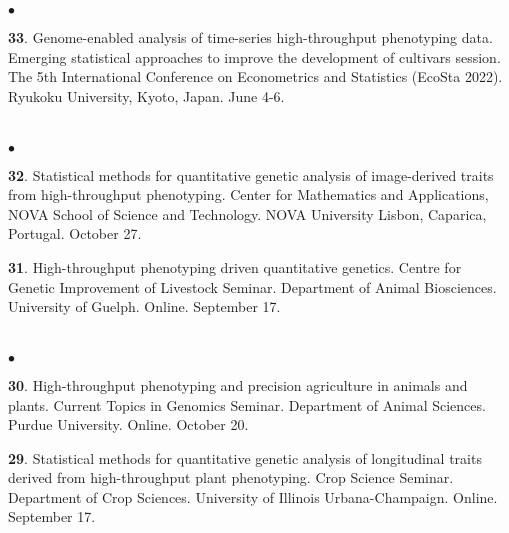 \documentclass[margin,line,10pt]{res}
\newenvironment{list2}{
  \begin{list}{$\bullet$}{%
      \setlength{\itemsep}{0in}
      \setlength{\parsep}{0in} \setlength{\parskip}{0in}
      \setlength{\topsep}{0in} \setlength{\partopsep}{0in} 
      \setlength{\leftmargin}{0.2in}}}{\end{list}}
\begin{document}
\begin{resume}
\begin{list2}
\vspace{0.5cm}


\item [{\bf 33}.] Genome-enabled analysis of time-series high-throughput phenotyping data. Emerging statistical approaches to improve the development of cultivars session. The 5th International Conference on Econometrics and Statistics (EcoSta 2022). Ryukoku University, Kyoto, Japan. June 4-6.

  
\end{list2}



\section{}
\begin{list2}

\item [{\bf 32}.] Statistical methods for quantitative genetic analysis of image-derived traits from high-throughput phenotyping. Center for Mathematics and Applications, NOVA School of Science and Technology. NOVA University Lisbon, Caparica, Portugal. October 27.

      \vspace{0.5cm}
  
 \item [{\bf 31}.] High-throughput phenotyping driven quantitative genetics. Centre for Genetic Improvement of Livestock Seminar. Department of Animal Biosciences. University of Guelph. Online. September 17.

\end{list2}

\section{}
\begin{list2}

  \item [{\bf 30}.] High-throughput phenotyping and precision agriculture in animals and plants. Current Topics in Genomics Seminar. Department of Animal Sciences. Purdue University. Online. October 20.

     \vspace{0.5cm}

 \item [{\bf 29}.] Statistical methods for quantitative genetic analysis of longitudinal traits derived from high-throughput plant phenotyping. Crop Science Seminar. Department of Crop Sciences. University of Illinois Urbana-Champaign. Online. September 17. 


\end{list2}
\end{resume}
\end{document}

